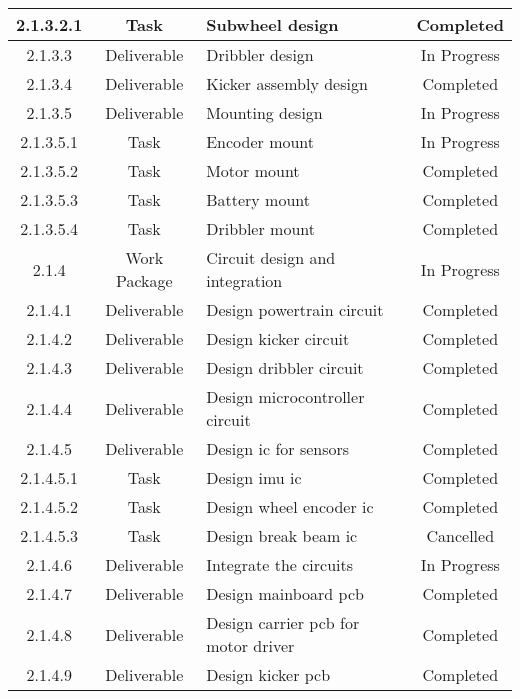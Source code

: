 \begin{longtable}{|c|c|m{}|c|}
    \rowcolor{d} 2.1.3.2.1 & Task & Subwheel design & Completed \\ \hline
    \rowcolor{p} 2.1.3.3 & Deliverable & Dribbler design & In Progress \\ \hline
    \rowcolor{d} 2.1.3.4 & Deliverable & Kicker assembly design & Completed \\ \hline
    \rowcolor{p} 2.1.3.5 & Deliverable & Mounting design & In Progress \\ \hline
    \rowcolor{p} 2.1.3.5.1 & Task & Encoder mount & In Progress \\ \hline
    \rowcolor{d} 2.1.3.5.2 & Task & Motor mount & Completed \\ \hline
    \rowcolor{d} 2.1.3.5.3 & Task & Battery mount & Completed \\ \hline
    \rowcolor{d} 2.1.3.5.4 & Task & Dribbler mount & Completed \\ \hline
    \rowcolor{p} 2.1.4 & Work Package & Circuit design and integration & In Progress \\ \hline
    \rowcolor{d} 2.1.4.1 & Deliverable & Design powertrain circuit & Completed \\ \hline
    \rowcolor{d} 2.1.4.2 & Deliverable & Design kicker circuit & Completed  \\ \hline
    \rowcolor{d} 2.1.4.3 & Deliverable & Design dribbler circuit & Completed \\ \hline
    \rowcolor{d} 2.1.4.4 & Deliverable & Design microcontroller circuit & Completed \\ \hline
    \rowcolor{d} 2.1.4.5 & Deliverable & Design \acs{ic} for sensors & Completed \\ \hline
    \rowcolor{d} 2.1.4.5.1 & Task & Design \acs{imu} \acs{ic} & Completed \\ \hline
    \rowcolor{d} 2.1.4.5.2 & Task & Design wheel encoder \acs{ic} & Completed \\ \hline
    \rowcolor{c} 2.1.4.5.3 & Task & Design break beam \acs{ic} & Cancelled \\ \hline
    \rowcolor{p} 2.1.4.6 & Deliverable & Integrate the circuits & In Progress \\ \hline
    \rowcolor{d} 2.1.4.7 & Deliverable & Design mainboard \acs{pcb} & Completed \\ \hline
    \rowcolor{d} 2.1.4.8 & Deliverable & Design carrier \acs{pcb} for motor driver & Completed \\ \hline
    \rowcolor{d} 2.1.4.9 & Deliverable & Design kicker \acs{pcb} & Completed \\ \hline

\end{longtable}
